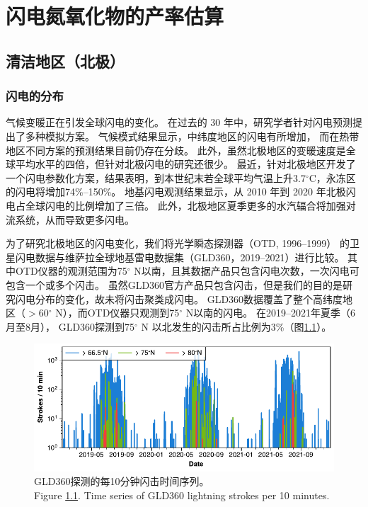 
\chapter{闪电氮氧化物的产率估算} \label{chapter:PE}

\section{清洁地区（北极）} \label{sec:arctic}

\subsection{闪电的分布} \label{subsect:lightning_distribution}

气候变暖正在引发全球闪电的变化\citep{Reeve.1999,Williams.2005a,Price.2009a}。
在过去的 30 年中，研究学者针对闪电预测提出了多种模拟方案\citep{Price.1992,Price.1997b,Allen.2002,Futyan.2007,Finney.2014,Romps.2014}。
气候模式结果显示，中纬度地区的闪电有所增加\citep{Michalon.1999,Romps.2014,Luhar.2021}，
而在热带地区不同方案的预测结果目前仍存在分歧\citep{Finney.2018,Romps.2019}。
此外，虽然北极地区的变暖速度是全球平均水平的四倍\citep{Rantanen.2022}，但针对北极闪电的研究还很少。
最近，\citet{Chen.2021a}针对北极地区开发了一个闪电参数化方案，结果表明，到本世纪末若全球平均气温上升3.7$^{\circ}$C，永冻区的闪电将增加74\%--150\%。
地基闪电观测结果显示，从 2010 年到 2020 年北极闪电占全球闪电的比例增加了三倍\citep{Holzworth.2021}。
此外，北极地区夏季更多的水汽辐合将加强对流系统，从而导致更多闪电\citep{Bintanja.2020}。

为了研究北极地区的闪电变化，我们将光学瞬态探测器（OTD, 1996--1999）\citep{Christian.2003} 的卫星闪电数据与维萨拉全球地基雷电数据集（GLD360，2019--2021）进行比较。
其中OTD仪器的观测范围为75$^{\circ}$ N以南，且其数据产品只包含闪电次数，一次闪电可包含一个或多个闪击。
虽然GLD360官方产品只包含闪击，但是我们的目的是研究闪电分布的变化，故未将闪击聚类成闪电。
GLD360数据覆盖了整个高纬度地区（$>$60$^{\circ}$ N），而OTD仪器只观测到75$^{\circ}$ N以南的闪电。
在2019--2021年夏季（6月至8月）， GLD360探测到75$^{\circ}$ N 以北发生的闪击所占比例为3\%（图\ref{fig:gld360_tseries}）。

\begin{figure}[!htbp]
\centering
\includegraphics[width=12cm]{./figures/arctic_gld360_tseries.pdf}
\caption{
GLD360探测的每10分钟闪击时间序列。\\
Figure \ref{fig:gld360_tseries}. Time series of GLD360 lightning strokes per 10 minutes.
}
\label{fig:gld360_tseries}
\end{figure}


